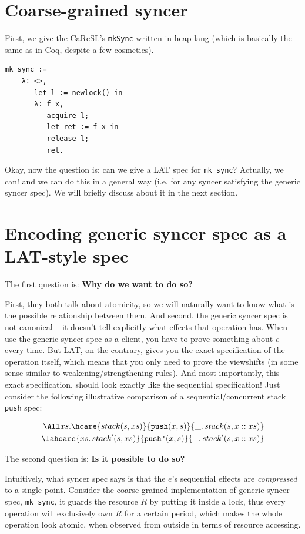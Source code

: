 \documentclass[11pt]{article}
\begin{document}
\section{Coarse-grained syncer}\label{mksync}

First, we give the CaReSL's \texttt{mkSync} written in heap-lang (which is basically the same as in Coq, despite a few cosmetics).

\begin{verbatim}
mk_sync :=
    λ: <>,
       let l := newlock() in
       λ: f x,
          acquire l;
          let ret := f x in
          release l;
          ret.
\end{verbatim}

Okay, now the question is: can we give a LAT spec for \texttt{mk\_sync}? Actually, we can! and we can do this in a general way (i.e. for any syncer satisfying the generic syncer spec). We will briefly discuss about it in the next section.

\section{Encoding generic syncer spec as a LAT-style spec}

The first question is: \textbf{Why do we want to do so?}

First, they both talk about atomicity, so we will naturally want to know what is the possible relationship between them. And second, the generic syncer spec is not canonical -- it doesn't tell explicitly what effects that operation has. When use the generic syncer spec as a client, you have to prove something about $e$ every time. But LAT, on the contrary, gives you the exact specification of the operation itself, which means that you only need to prove the viewshifts (in some sense similar to weakening/strengthening rules). And most importantly, this exact specification, should look exactly like the sequential specification! Just consider the following illustrative comparison of a sequential/concurrent stack \texttt{push} spec:

\begin{align*}
  \All xs.\hoare{stack(s, xs)}{\texttt{push}(x, s)}{\_.\, stack(s, x::xs)}\\
  \lahoare{xs.\, stack'(s, xs)}{\texttt{push'}(x, s)}{\_.\, stack'(s, x::xs)}
\end{align*}

The second question is: \textbf{Is it possible to do so?}

Intuitively, what syncer spec says is that the $e$'s sequential effects are \emph{compressed} to a single point. Consider the coarse-grained implementation of generic syncer spec, \texttt{mk\_sync}, it guards the resource $R$ by putting it inside a lock, thus every operation will exclusively own $R$ for a certain period, which makes the whole operation look atomic, when observed from outside in terms of resource accessing.
\end{document}
